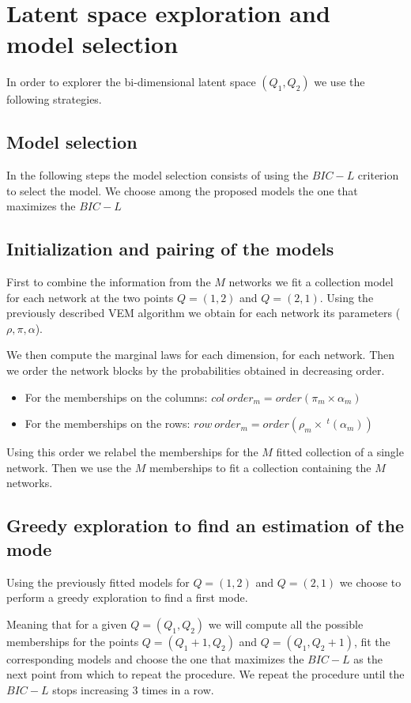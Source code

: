 \documentclass[12pt,a4paper]{rapport1}
\begin{document}
\section{Latent space exploration and model selection}
In order to explorer the bi-dimensional latent space $(Q_1,Q_2)$
we use the following strategies.

\subsection{Model selection}
In the following steps the model selection consists of using the $BIC-L$ 
criterion to select the model. We choose among the proposed models the one that
maximizes the $BIC-L$

\subsection{Initialization and pairing of the models}
First to combine the information from the $M$ networks we fit a collection model
for each network at the two points $Q = (1, 2)$ and $Q = (2, 1)$. Using the 
previously described VEM algorithm we obtain for each network its parameters 
($\rho,\pi,\alpha$).

We then compute the marginal laws for each dimension, for each network. Then 
we order the network blocks by the probabilities obtained in decreasing order.
\begin{itemize}
    \item For the memberships on the columns: 
    $col~order_m = order\left(\pi_m \times \alpha_m\right)$ 
    \item For the memberships on the rows:
    $row~order_m = order\left(\rho_m \times ~^{t}(\alpha_m)\right)$ 
\end{itemize}

Using this order we relabel the memberships for the $M$ fitted collection of a
single network.
Then we use the $M$ memberships to fit a collection containing the $M$ networks.
\subsection{Greedy exploration to find an estimation of the mode}
Using the previously fitted models for $Q = (1,2)$ and $Q = (2,1)$ we choose to
perform a greedy exploration to find a first mode.

Meaning that for a given $Q = (Q_1, Q_2)$ we will compute all the possible 
memberships for the points $Q = (Q_1 + 1, Q_2)$ and $Q = (Q_1, Q_2 + 1)$, fit
the corresponding models and choose the one that maximizes the $BIC-L$ as the 
next point from which to repeat the procedure. We repeat the procedure until the
$BIC-L$ stops increasing $3$ times in a row.
\end{document}
